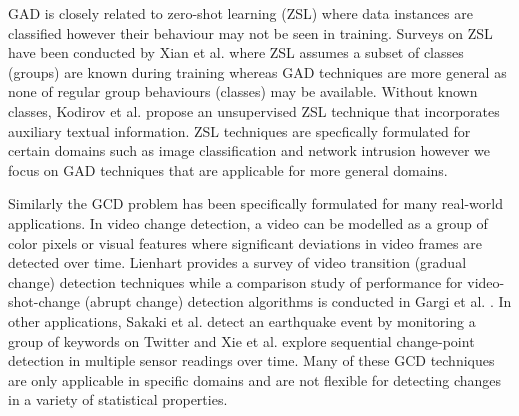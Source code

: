 {  
GAD is closely related to zero-shot learning (ZSL) where data instances are classified however their behaviour may not be seen in training. %
Surveys on ZSL have been conducted by Xian et al. \cite{ZSLsurvey} where ZSL assumes a subset of classes (groups) are known during training whereas GAD techniques are more general as none of regular  group behaviours (classes) may be available.
  Without known classes,  Kodirov et al. \cite{unsupervisedZSL} propose an unsupervised ZSL technique that incorporates auxiliary textual information.   ZSL techniques are specfically formulated for certain domains such as image classification \cite{ZSLanomaly} and network intrusion  \cite{perez2016} however we focus on GAD techniques that are applicable for more general domains. 



Similarly the GCD problem has been  specifically formulated for many real-world applications. In video change detection, a video can be modelled as a group of color pixels or visual features where  significant deviations in video frames are detected over time. Lienhart 
\cite{VideoSurvey} provides a survey of video transition (gradual change) detection techniques while a comparison study of performance for video-shot-change (abrupt  change) detection algorithms is conducted in Gargi et al. \cite{gargi2000}. %
  In other applications, Sakaki et al. \cite{sakaki2010} detect an earthquake event by monitoring a group of keywords on Twitter and  Xie et al. \cite{xie2013} explore  sequential change-point detection in multiple sensor readings over time. %
Many of these GCD techniques are only applicable in  specific domains and are not flexible for detecting changes in a variety of statistical properties.   
}

